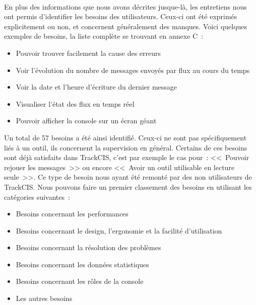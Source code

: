 			\paragraph{}%
			En plus des informations que nous avons décrites jusque-là, les entretiens
			nous ont permis d'identifier les besoins des utilisateurs. Ceux-ci ont été
			exprimés explicitement ou non, et concernent généralement des manques. Voici
			quelques exemples de besoins, la liste complète se trouvant en annexe C~:
			\begin{itemize}
			  \item Pouvoir trouver facilement la cause des erreurs
			  \item Voir l'évolution du nombre de messages envoyés par flux au cours du
			  temps
			  \item Voir la date et l'heure d'écriture du dernier message
			  \item Visualiser l'état des flux en temps réel
			  \item Pouvoir afficher la console sur un écran géant
			\end{itemize}
			Un total de 57 besoins a été ainsi identifié. Ceux-ci ne sont pas
			spécifiquement liés à un outil, ils concernent la supervision
			en général. Certains de ces besoins sont déjà satisfaits dans
			TrackCIS, c'est par exemple le cas pour~: <<~Pouvoir rejouer les
			messages~>> ou encore <<~Avoir un outil utilisable en lecture seule~>>. Ce
			type de besoin nous ayant été remonté par des non utilisateurs de TrackCIS. Nous
			pouvons faire un premier classement des besoins en utilisant les catégories
			suivantes~:
			\begin{itemize}
			  \item Besoins concernant les performances
			  \item Besoins concernant le design, l'ergonomie et la facilité
			  d'utilisation
			  \item Besoins concernant la résolution des problèmes
			  \item Besoins concernant les données statistiques
			  \item Besoins concernant les rôles de la console
			  \item Les autres besoins
			\end{itemize}
			
